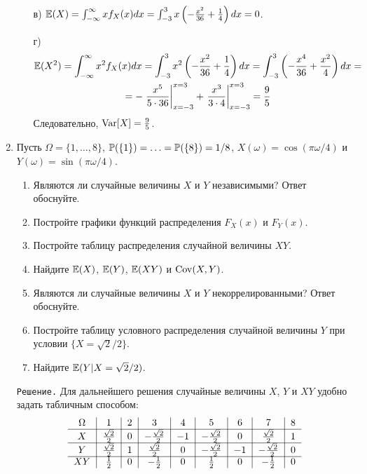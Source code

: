 \begin{enumerate}
\begin{enumerate}
\item[в)] $\E(X) = \int_{-\infty}^{\infty}xf_X(x)dx = \int_{-3}^{3}x\left(-\frac{x^2}{36} + \frac{1}{4}\right)dx = 0$.

\item[г)]
\begin{multline*}
\E(X^2) = \int_{-\infty}^{\infty}x^2f_X(x)dx = \int_{-3}^{3}x^2\left(-\frac{x^2}{36} + \frac{1}{4}\right)dx = \int_{-3}^{3}\left(-\frac{x^4}{36} + \frac{x^2}{4}\right)dx = \\
= -\left.\frac{x^5}{5\cdot36}\right|_{x=-3}^{x=3} + \left.\frac{x^3}{3\cdot4}\right|_{x=-3}^{x=3} = \frac{9}{5}
\end{multline*}
Следовательно, $\Var[X] = \frac{9}{5}$.
\end{enumerate}
\item %

Пусть $\Omega = \{1,\ldots,8\}$, $\P(\{1\}) = \ldots = \P(\{8\}) = 1/8$, $X(\omega) = \cos(\pi\omega/4)$ и $Y(\omega) = \sin(\pi\omega/4)$.
\begin{enumerate}
  \item Являются ли случайные величины $X$ и $Y$ независимыми? Ответ обоснуйте.
  \item Постройте графики функций распределения $F_X(x)$ и $F_Y(x)$.
  \item Постройте таблицу распределения случайной величины $XY$.
  \item Найдите $\E(X)$, $\E(Y)$, $\E(XY)$ и $\Cov(X,Y)$.
  \item Являются ли случайные величины $X$ и $Y$ некоррелированными? Ответ обоснуйте.
  \item Постройте таблицу условного распределения случайной величины $Y$ при условии $\{X = \sqrt{2}/2\}$.
  \item Найдите $\E(Y|X = \sqrt{2}/2)$.
\end{enumerate}

\verb"Решение." Для дальнейшего решения случайные величины $X$, $Y$ и $XY$ удобно задать табличным способом:
\[
\begin{tabular}{c|c|c|c|c|c|c|c|c}
  $\Omega$       & $1$                      & $2$     & $3$                      & $4$     & $5$                     & $6$     & $7$                    & $8$    \\ \cline{1-9}
  $X$            & $\frac{\sqrt{2}}{2}$     & $0$     & $-\frac{\sqrt{2}}{2}$    & $-1$    & $-\frac{\sqrt{2}}{2}$   & $0$     & $\frac{\sqrt{2}}{2}$   & $1$    \\ \cline{1-9}
  $Y$            & $\frac{\sqrt{2}}{2}$     & $1$     & $\frac{\sqrt{2}}{2}$     & $0$     & $-\frac{\sqrt{2}}{2}$   & $-1$    & $-\frac{\sqrt{2}}{2}$  & $0$    \\ \cline{1-9}
  $XY$           & $\frac{1}{2}$            & $0$     & $-\frac{1}{2}$           & $0$     & $\frac{1}{2}$           & $0$     & $-\frac{1}{2}$         & $0$    \\
\end{tabular}
\]


\end{enumerate}
